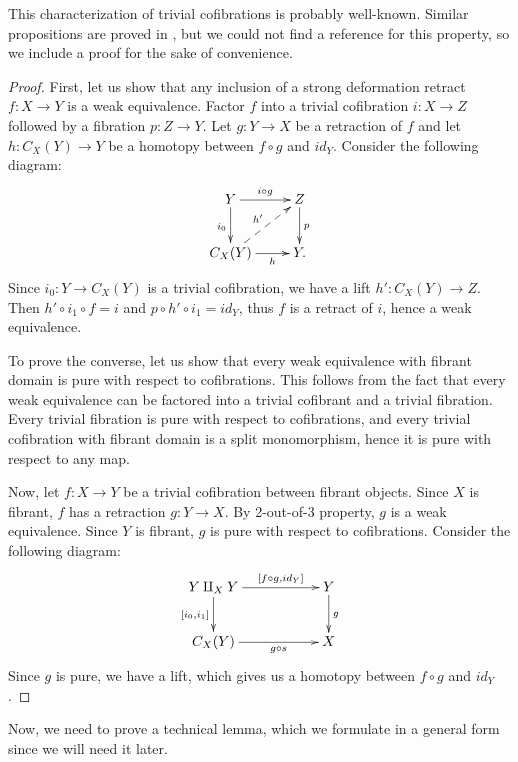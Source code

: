 \documentclass{tac}
\theoremstyle{definition}
\newcommand{\cyli}{i}
\begin{document}
This characterization of trivial cofibrations is probably well-known.
Similar propositions are proved in \cite{hirschhorn}, but we could not find a reference for this property, so we include a proof for the sake of convenience.

\begin{proof}
First, let us show that any inclusion of a strong deformation retract $f : X \to Y$ is a weak equivalence.
Factor $f$ into a trivial cofibration $i : X \to Z$ followed by a fibration $p : Z \to Y$.
Let $g : Y \to X$ be a retraction of $f$ and let $h : C_X(Y) \to Y$ be a homotopy between $f \circ g$ and $id_Y$.
Consider the following diagram:
\[ \xymatrix{ Y \ar[r]^{i \circ g} \ar[d]_{\cyli_0} & Z \ar[d]^p \\
              C_X(Y) \ar[r]_-h \ar@{-->}[ur]^{h'}   & Y.
            } \]
Since $\cyli_0 : Y \to C_X(Y)$ is a trivial cofibration, we have a lift $h' : C_X(Y) \to Z$.
Then $h' \circ \cyli_1 \circ f = i$ and $p \circ h' \circ \cyli_1 = id_Y$, thus $f$ is a retract of $i$, hence a weak equivalence.

To prove the converse, let us show that every weak equivalence with fibrant domain is pure with respect to cofibrations.
This follows from the fact that every weak equivalence can be factored into a trivial cofibrant and a trivial fibration.
Every trivial fibration is pure with respect to cofibrations, and every trivial cofibration with fibrant domain is a split monomorphism,
hence it is pure with respect to any map.

Now, let $f : X \to Y$ be a trivial cofibration between fibrant objects.
Since $X$ is fibrant, $f$ has a retraction $g : Y \to X$.
By 2-out-of-3 property, $g$ is a weak equivalence.
Since $Y$ is fibrant, $g$ is pure with respect to cofibrations.
Consider the following diagram:
\[ \xymatrix{ Y \amalg_X Y \ar[rr]^-{[f \circ g, id_Y]} \ar[d]_{[\cyli_0,\cyli_1]} & & Y \ar[d]^g \\
              C_X(Y) \ar[rr]_-{g \circ s} & & X
            } \]
Since $g$ is pure, we have a lift, which gives us a homotopy between $f \circ g$ and $id_Y$.
\end{proof}

Now, we need to prove a technical lemma, which we formulate in a general form since we will need it later.
\end{document}

